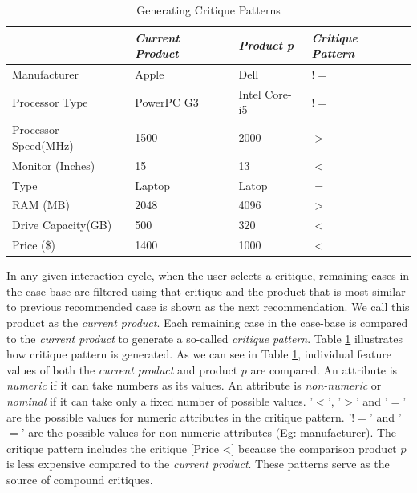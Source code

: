 \begin{table}[h]
\caption{Generating Critique Patterns}
\centering
\renewcommand{\arraystretch}{1.2}
\label{tab:critiquePatterns}

\begin{tabular}{|l|l|l|l|}
\hline
& \textit{Current Product} & \textit{Product p} & \textit{Critique Pattern}\\
\hline
Manufacturer & Apple & Dell & $!=$\\
\hline
Processor Type & PowerPC G3 & Intel Core-i5 & $!=$\\
\hline
Processor Speed(MHz) & 1500 & 2000 & $>$ \\
\hline
Monitor (Inches) & 15  & 13 & $<$\\
\hline
Type & Laptop & Latop & $=$\\ 
\hline
RAM (MB) & 2048 & 4096 & $>$ \\
\hline
Drive Capacity(GB) & 500 & 320 & $<$ \\
\hline
Price (\$) & 1400 & 1000 & $<$\\
\hline
\end{tabular}
\end{table}

In any given interaction cycle, when the user selects a critique, remaining cases in the case base are filtered using that critique and the product that is most similar to previous recommended case is shown as the next recommendation.
We call this product as the \textit{current product}.
Each remaining case in the case-base is compared to the \textit{current product} to generate a so-called \textit{critique pattern}. 
Table \ref{tab:critiquePatterns} illustrates how critique pattern is generated.
As we can see in Table \ref{tab:critiquePatterns}, individual feature values of both the \textit{current product} and product $p$ are compared.
An attribute is \textit{numeric} if it can take numbers as its values.
An attribute is \textit{non-numeric} or \textit{nominal} if it can take only a fixed number of possible values.
'$<$', '$>$' and '$=$' are the possible values for numeric attributes in the critique pattern.
'$!=$' and '$=$' are the possible values for non-numeric attributes (Eg: manufacturer).
The critique pattern includes the critique [Price \textless] because the comparison product $p$ is less expensive compared to the \textit{current product}.
These patterns serve as the source of compound critiques.


